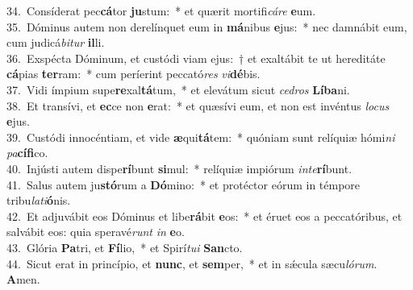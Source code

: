 {34.~}Consíderat pec\textbf{cá}tor \textbf{ju}stum:~* et quærit mortifi\textit{cá}\textit{re} \textbf{e}um.\\
{35.~}Dóminus autem non derelínquet eum in \textbf{má}nibus \textbf{e}jus:~* nec damnábit eum, cum judicá\textit{bi}\textit{tur} \textbf{il}li.\\
{36.~}Exspécta Dóminum, et custódi viam ejus:~† et exaltábit te ut hereditáte \textbf{cá}pias \textbf{ter}ram:~* cum períerint peccató\textit{res} \textit{vi}\textbf{dé}bis.\\
{37.~}Vidi ímpium supe\textbf{re}xal\textbf{tá}tum,~* et elevátum sicut \textit{ce}\textit{dros} \textbf{Lí}\textbf{ba}ni.\\
{38.~}Et transívi, et \textbf{ec}ce non \textbf{e}rat:~* et quæsívi eum, et non est invéntus \textit{lo}\textit{cus} \textbf{e}jus.\\
{39.~}Custódi innocéntiam, et vide \textbf{æ}qui\textbf{tá}tem:~* quóniam sunt relíquiæ hómi\textit{ni} \textit{pa}\textbf{cí}\textbf{fi}co.\\
{40.~}Injústi autem dispe\textbf{rí}bunt \textbf{si}mul:~* relíquiæ impiórum \textit{in}\textit{te}\textbf{rí}bunt.\\
{41.~}Salus autem ju\textbf{stó}rum a \textbf{Dó}mino:~* et protéctor eórum in témpore tribu\textit{la}\textit{ti}\textbf{ó}nis.\\
{42.~}Et adjuvábit eos Dóminus et libe\textbf{rá}bit \textbf{e}os:~* et éruet eos a peccatóribus, et salvábit eos: quia speravé\textit{runt} \textit{in} \textbf{e}o.\\
{43.~}Glória \textbf{Pa}tri, et \textbf{Fí}lio,~* et Spirí\textit{tu}\textit{i} \textbf{San}cto.\\
{44.~}Sicut erat in princípio, et \textbf{nunc}, et \textbf{sem}per,~* et in sǽcula sæcu\textit{ló}\textit{rum}. \textbf{A}men.\\
